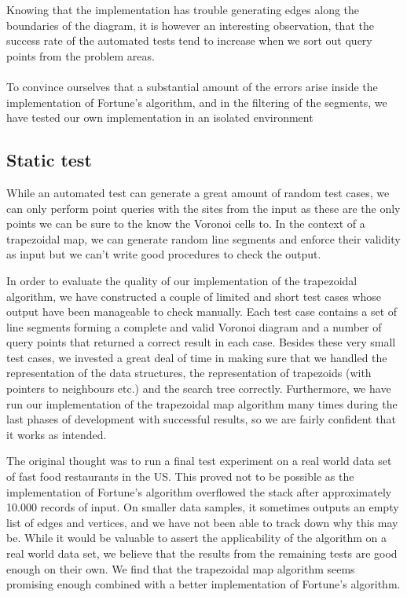 Knowing that the implementation has trouble generating edges along the boundaries of the diagram, it is however an interesting observation, that the success rate of the automated tests tend to increase when we sort out query points from the problem areas.\paragraph{}

To convince ourselves that a substantial amount of the errors arise inside the implementation of Fortune’s algorithm, and in the filtering of the segments, we have tested our own implementation in an isolated environment 

\subsection{Static test}
While an automated test can generate a great amount of random test cases, we can only perform point queries with the sites from the input as these are the only points we can be sure to the know the Voronoi cells to. In the context of a trapezoidal map, we can generate random line segments and enforce their validity as input but we can’t write good procedures to check the output.

In order to evaluate the quality of our implementation of the trapezoidal algorithm, we have constructed a couple of limited and short test cases whose output have been manageable to check manually. Each test case contains a set of line segments forming a complete and valid Voronoi diagram and a number of query points that returned a correct result in each case. Besides these very small test cases, we invested a great deal of time in making sure that we handled the representation of the data structures, the representation of trapezoids (with pointers to neighbours etc.) and the search tree correctly.
Furthermore, we have run our implementation of the trapezoidal map algorithm many times during the last phases of development with successful results, so we are fairly confident that it works as intended.

The original thought was to run a final test experiment on a real world data set of fast food restaurants in the US. This proved not to be possible as the implementation of Fortune’s algorithm overflowed the stack after approximately 10.000 records of input. On smaller data samples, it sometimes outputs an empty list of edges and vertices, and we have not been able to track down why this may be. While it would be valuable to assert the applicability of the algorithm on a real world data set, we believe that the results from the remaining tests are good enough on their own. We find that the trapezoidal map algorithm seems promising enough combined with a better implementation of Fortune’s algorithm. 


